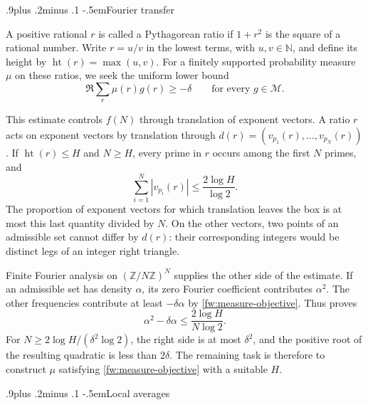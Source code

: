 \documentclass[twoside]{aomart}
\makeatletter
\theoremstyle{paperplain}
\theoremstyle{paperdefinition}
\renewcommand\subsection{\@startsection{subsection}{2}{\z@}
  {.9\baselineskip plus .2\baselineskip minus .1\baselineskip}
  {-.5em}{\normalfont\bfseries}}
\newcommand{\Z}{\mathbb Z}
\newcommand{\N}{\mathbb N}
\numberwithin{equation}{section}
\makeatother
\begin{document}
\subsection{Fourier transfer}

A positive rational $r$ is called a Pythagorean ratio if $1+r^2$
is the square of a rational number. Write $r=u/v$ in the lowest terms,
with $u,v\in\N$, and define its height by
$
 \operatorname{ht}(r)=\max(u,v).
$
For a finitely supported probability measure $\mu$ on these ratios,
we seek the uniform lower bound
\begin{equation}
 \Re\sum_r\mu(r)g(r)\ge-\delta
 \qquad\text{for every }g\in\mathcal M.
 \label{fw:measure-objective}
\end{equation}

This estimate controls $f(N)$ through translation of exponent
vectors. A ratio $r$ acts on exponent
vectors by translation through
$d(r)=(v_{p_1}(r),\ldots,v_{p_N}(r))$. If $\operatorname{ht}(r)\le H$
and $N\ge H$, every prime in $r$ occurs among the first $N$ primes,
and
\begin{equation*}
 \sum_{i=1}^N|v_{p_i}(r)|\le\frac{2\log H}{\log2}.
\end{equation*}
The proportion of exponent vectors for which translation leaves
the box is at most this last quantity divided by $N$.
On the other vectors, two points of an admissible set cannot differ
by $d(r)$: their corresponding integers would be distinct legs of
an integer right triangle.

Finite Fourier analysis on $(\Z/N\Z)^N$ supplies the other side of
the estimate. If an admissible set has density $\alpha$, its zero
Fourier coefficient contributes $\alpha^2$. The other frequencies
contribute at least $-\delta\alpha$ by
\eqref{fw:measure-objective}. Thus  proves
\begin{equation*}
 \alpha^2-\delta\alpha
 \le\frac{2\log H}{N\log2}.
\end{equation*}
For $N\ge2\log H/(\delta^2\log2)$, the right side is at most
$\delta^2$, and the positive root of the resulting quadratic is
less than $2\delta$. The remaining task is therefore to construct
$\mu$ satisfying \eqref{fw:measure-objective} with a suitable $H$.

\subsection{Local averages}
\end{document}

